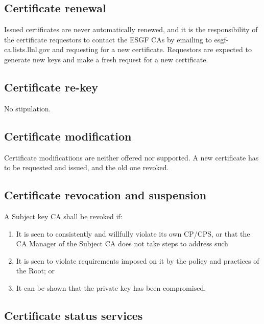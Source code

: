 \subsection{Certificate renewal}\label{certificate-renewal}

Issued certificates are never automatically renewed, and it is the responsibility of the certificate requestors to contact the ESGF CAs by emailing to esgf-ca.lists.llnl.gov and requesting for a new certificate. Requestors are expected to generate new keys and make a fresh request for a new certificate.

\subsection{Certificate re-key}
No stipulation.

\subsection{Certificate modification}
Certificate modificatiions are neither offered nor supported. A new certificate has to be requested and issued, and the old one revoked.

\subsection{Certificate revocation and suspension}\label{certificate-revocation-and-suspension}

A Subject key CA shall be revoked if:

\begin{enumerate}
\item
  
  It is seen to consistently and willfully violate its own CP/CPS, or
  that the CA Manager of the Subject CA does not take steps to address
  such
  
\item
  
  It is seen to violate requirements imposed on it by the policy and
  practices of the Root; or
  
\item
  
  It can be shown that the private key has been compromised.
  
\end{enumerate}

\subsection{Certificate status services}\label{certificate-status-services}

